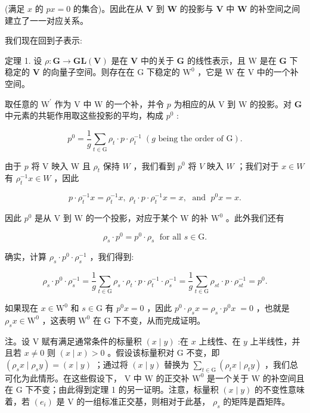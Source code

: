 \documentclass[10pt]{article}
\begin{document}
(满足 \(x\) 的 \({px} = 0\) 的集合)。因此在从 \(\mathbf{V}\) 到 \(\mathbf{W}\) 的投影与 \(\mathbf{V}\) 中 \(\mathbf{W}\) 的补空间之间建立了一一对应关系。

我们现在回到子表示:

定理 1. 设 \(\rho  : \mathbf{G} \rightarrow  \mathbf{{GL}}\left( \mathbf{V}\right)\) 是在 \(\mathbf{V}\) 中的关于 \(\mathbf{G}\) 的线性表示，且 W 是在 \(\mathbf{G}\) 下稳定的 \(\mathbf{V}\) 的向量子空间。则存在在 \(\mathrm{G}\) 下稳定的 \({\mathrm{W}}^{0}\) ，它是 \(\mathrm{W}\) 在 \(\mathrm{V}\) 中的一个补空间。

取任意的 \({\mathrm{W}}^{\prime }\) 作为 \(\mathrm{V}\) 中 \(\mathrm{W}\) 的一个补，并令 \(p\) 为相应的从 \(\mathrm{V}\) 到 \(\mathrm{W}\) 的投影。对 \(\mathbf{G}\) 中元素的共轭作用取这些投影的平均，构成 \({p}^{0}\) :

\[
{p}^{0} = \frac{1}{g}\mathop{\sum }\limits_{{t \in  \mathrm{G}}}{\rho }_{t} \cdot  p \cdot  {\rho }_{t}^{-1}\;\left( {g\text{ being the order of }\mathrm{G}}\right) .
\]

由于 \(p\) 将 V 映入 W 且 \({\rho }_{t}\) 保持 \(W\) ，我们看到 \({p}^{0}\) 将 \(V\) 映入 \(W\) ；我们对于 \(x \in  W\) 有 \({\rho }_{t}^{-1}x \in  W\) ，因此

\[
p \cdot  {\rho }_{t}^{-1}x = {\rho }_{t}^{-1}x,\;{\rho }_{t} \cdot  p \cdot  {\rho }_{t}^{-1}x = x,\;\text{ and }\;{p}^{0}x = x.
\]

因此 \({p}^{0}\) 是从 \(\mathrm{V}\) 到 \(\mathrm{W}\) 的一个投影，对应于某个 \(\mathrm{W}\) 的补 \({\mathrm{W}}^{0}\) 。此外我们还有

\[
{\rho }_{s} \cdot  {p}^{0} = {p}^{0} \cdot  {\rho }_{s}\;\text{ for all }s \in  \mathrm{G}.
\]

确实，计算 \({\rho }_{s} \cdot  {p}^{0} \cdot  {\rho }_{s}^{-1}\) ，我们得到:

\[
{\rho }_{s} \cdot  {p}^{0} \cdot  {\rho }_{s}^{-1} = \frac{1}{g}\mathop{\sum }\limits_{{t \in  \mathrm{G}}}{\rho }_{s} \cdot  {\rho }_{t} \cdot  p \cdot  {\rho }_{t}^{-1} \cdot  {\rho }_{s}^{-1} = \frac{1}{g}\mathop{\sum }\limits_{{t \in  \mathrm{G}}}{\rho }_{st} \cdot  p \cdot  {\rho }_{st}^{-1} = {p}^{0}.
\]

如果现在 \(x \in  {\mathrm{W}}^{0}\) 和 \(s \in  \mathrm{G}\) 有 \({p}^{0}x = 0\) ，因此 \({p}^{0} \cdot  {\rho }_{s}x = {\rho }_{s} \cdot  {p}^{0}x \; = 0\) ，也就是 \({\rho }_{s}x \in  {\mathrm{W}}^{0}\) ，这表明 \({\mathrm{W}}^{0}\) 在 \(\mathrm{G}\) 下不变，从而完成证明。

注。设 \(\mathrm{V}\) 赋有满足通常条件的标量积 \(\left( {x \mid  y}\right)\) :在 \(x\) 上线性、在 \(y\) 上半线性，并且若 \(x \neq  0\) 则 \(\left( {x \mid  x}\right)  > 0\) 。假设该标量积对 G 不变，即 \(\left( {{\rho }_{s}x \mid  {\rho }_{s}y}\right)  = \left( {x \mid  y}\right)\) ；通过将 \(\left( {x \mid  y}\right)\) 替换为 \(\mathop{\sum }\limits_{{t \in  \mathrm{G}}}\left( {{\rho }_{t}x \mid  {\rho }_{t}y}\right)\) ，我们总可化为此情形。在这些假设下， \(\mathrm{V}\) 中 \(\mathrm{W}\) 的正交补 \({\mathrm{W}}^{0}\) 是一个关于 \(\mathrm{W}\) 的补空间且在 \(\mathrm{G}\) 下不变；由此得到定理 1 的另一证明。注意，标量积 \(\left( {x \mid  y}\right)\) 的不变性意味着，若 \(\left( {e}_{i}\right)\) 是 \(\mathrm{V}\) 的一组标准正交基，则相对于此基， \({\rho }_{s}\) 的矩阵是酉矩阵。
\end{document}
